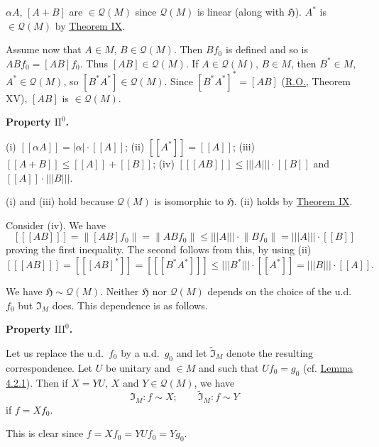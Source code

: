 \documentclass[twoside,leqno]{article}
\newcommand{\cH}{\mathfrak{H}}
\newcommand{\Q}{\mathcal{Q}}
\newcommand{\opnorm}[1]{\lvert\lvert\lvert#1\rvert\rvert\rvert}
\newcommand{\RO}{\href{https://doi.org/10.2307/1968693}{R.O.}}
\newcommand{\StatementTarget}[1]{\phantomsection\hypertarget{stmt:#1}{}}
\newcommand{\StatementRef}[2]{\hyperlink{stmt:#1}{#2}}
\newenvironment{statement}[2]{%
  \par\medskip
  \noindent\StatementTarget{#1}\hspace*{\parindent}\textbf{#2.}\ \itshape\ignorespaces
}{\par}
\begin{document}
\(\alpha A\), \([A+B]\) are \(\in\Q(M)\) since \(\Q(M)\) is linear
(along with \(\cH\)). \(A^*\) is \(\in\Q(M)\) by
\StatementRef{thm:IX}{Theorem IX}.

Assume now that \(A\in M\), \(B\in\Q(M)\). Then \(Bf_0\) is defined and so
is
\(ABf_0=[AB]f_0\).
Thus \([AB]\in\Q(M)\). If \(A\in\Q(M)\), \(B\in M\), then \(B^*\in M\),
\(A^*\in\Q(M)\), so \([B^*A^*]\in\Q(M)\). Since
\([B^*A^*]^*=[AB]\) (\RO, Theorem XV), \([AB]\) is \(\in\Q(M)\).

\begin{statement}{prop:II0}{Property \(\mathrm{II}^{0}\)}
(i) \([\![\alpha A]\!]=|\alpha|\cdot[\![A]\!]\); (ii)
\([\![A^*]\!]=[\![A]\!]\); (iii)
\([\![A+B]\!]\leq[\![A]\!]+[\![B]\!]\); (iv)
\([\![[AB]]\!]\leq\opnorm{A}\cdot[\![B]\!]\) and
\([\![A]\!]\cdot\opnorm{B}\).
\end{statement}

(i) and (iii) hold because \(\Q(M)\) is isomorphic to \(\cH\). (ii) holds
by \StatementRef{thm:IX}{Theorem IX}.

Consider (iv). We have
\[
 [\![[AB]]\!]=\lVert[AB]f_0\rVert=\lVert ABf_0\rVert
 \leq\opnorm{A}\cdot\lVert Bf_0\rVert
 =\opnorm{A}\cdot[\![B]\!]
\]
proving the first inequality. The second follows from this, by using (ii)
\[
 [\![[AB]]\!]=[\![[AB]^*]\!]=[\![[B^*A^*]]\!]
 \leq\opnorm{B^*}\cdot[\![A^*]\!]
 =\opnorm{B}\cdot[\![A]\!].
\]

We have \(\cH\sim\Q(M)\). Neither \(\cH\) nor \(\Q(M)\) depends on the
choice of the u.d.\ \(f_0\) but \(\mathfrak I_M\) does. This dependence is
as follows.

\begin{statement}{prop:III0}{Property \(\mathrm{III}^{0}\)}
Let us replace the u.d.\ \(f_0\) by a u.d.\ \(g_0\) and let
\(\widetilde{\mathfrak I}_M\) denote the resulting correspondence. Let
\(U\) be unitary and \(\in M\) and such that \(Uf_0=g_0\)
(cf. \StatementRef{lem:4.2.3}{Lemma 4.2.1}). Then if \(X=YU\), \(X\) and
\(Y\in\Q(M)\), we have
\[
 \mathfrak I_M:f\sim X;\qquad
 \widetilde{\mathfrak I}_M:f\sim Y
\]
if \(f=Xf_0\).
\end{statement}

This is clear since \(f=Xf_0=YUf_0=Yg_0\).
\end{document}
